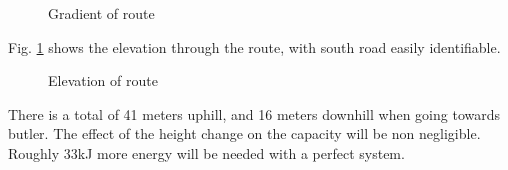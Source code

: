 \documentclass{article}
\begin{document}
\begin{figure}[H]
    \centering
    \caption{Gradient of route}
    \label{fig:route_el}
\end{figure}
Fig. \ref{fig:route_el} shows the elevation through the route, with south road easily identifiable. 
\begin{figure}[H]
    \centering
    \caption{Elevation of route}
    \label{fig:route_grad}
\end{figure}
There is a total of 41 meters uphill, and 16 meters downhill when going towards butler.
The effect of the height change on the capacity will be non negligible.
Roughly 33kJ more energy will be needed with a perfect system.
\end{document}

